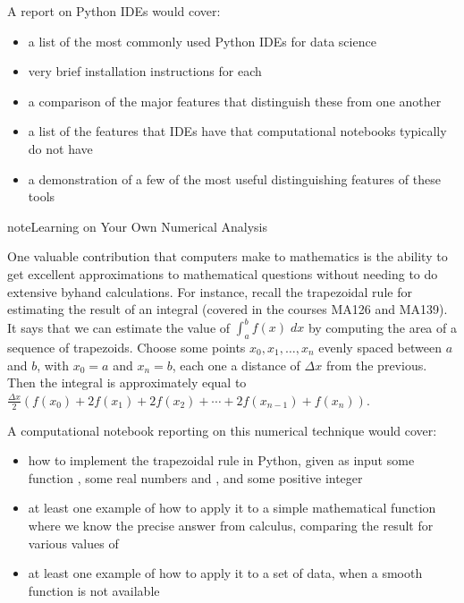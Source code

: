 \documentclass[letterpaper,10pt,english]{sphinxmanual}
\begin{document}
A report on Python IDEs would cover:
\begin{itemize}
\item {} 
a list of the most commonly used Python IDEs for data science

\item {} 
very brief installation instructions for each

\item {} 
a comparison of the major features that distinguish these from one another

\item {} 
a list of the features that IDEs have that computational notebooks typically do not have

\item {} 
a demonstration of a few of the most useful distinguishing features of these tools

\end{itemize}

\begin{sphinxadmonition}{note}{Learning on Your Own \sphinxhyphen{} Numerical Analysis}

One valuable contribution that computers make to mathematics is the ability to get excellent approximations to mathematical questions without needing to do extensive by\sphinxhyphen{}hand calculations.  For instance, recall the trapezoidal rule for estimating the result of an integral (covered in the courses MA126 and MA139).  It says that we can estimate the value of
\(\int_a^b f(x)\;dx\)
by computing the area of a sequence of trapezoids.  Choose some points \(x_0,x_1,\ldots,x_n\) evenly spaced between \(a\) and \(b\), with \(x_0=a\) and \(x_n=b\), each one a distance of \(\Delta x\) from the previous.  Then the integral is approximately equal to
\(\frac{\Delta x}{2}\left(f(x_0)+2f(x_1)+2f(x_2)+\cdots+2f(x_{n-1})+f(x_n)\right)\).
\end{sphinxadmonition}

A computational notebook reporting on this numerical technique would cover:
\begin{itemize}
\item {} 
how to implement the trapezoidal rule in Python, given as input some function , some real numbers  and , and some positive integer 

\item {} 
at least one example of how to apply it to a simple mathematical function  where we know the precise answer from calculus, comparing the result for various values of 

\item {} 
at least one example of how to apply it to a set of data, when a smooth function  is not available

\end{itemize}
\end{document}
